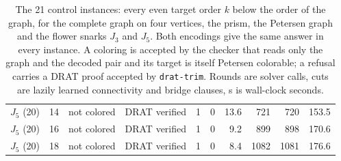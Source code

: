 \begin{table}[tbp]
\begin{tabular}{llllrrrrrr}
$J_5$ (20) & 14 & not colored & DRAT verified & 1 & 0 & 13.6 & 721 & 720 & 153.5 \\
$J_5$ (20) & 16 & not colored & DRAT verified & 1 & 0 & 9.2 & 899 & 898 & 170.6 \\
$J_5$ (20) & 18 & not colored & DRAT verified & 1 & 0 & 8.4 & 1082 & 1081 & 176.6 \\
\bottomrule
\end{tabular}
\caption{The 21 control instances: every even target order $k$ below the order of the graph, for the complete graph on four vertices, the prism, the Petersen graph and the flower snarks $J_3$ and $J_5$. Both encodings give the same answer in every instance. A coloring is accepted by the checker that reads only the graph and the decoded pair and its target is itself Petersen colorable; a refusal carries a DRAT proof accepted by \texttt{drat-trim}. Rounds are solver calls, cuts are lazily learned connectivity and bridge clauses, s is wall-clock seconds.}\label{tab:controls}
\end{table}
